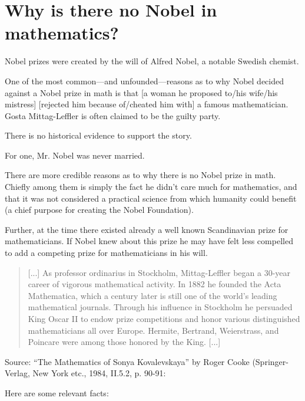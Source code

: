 \section{Why is there no Nobel in mathematics?}

Nobel prizes were created by the will of Alfred Nobel, a notable Swedish
chemist.

One of the most common---and unfounded---reasons as to why Nobel decided
against a Nobel prize in math is that [a woman he proposed to/his
wife/his mistress] [rejected him because of/cheated him with] a famous
mathematician. Gosta Mittag-Leffler is often claimed to be the guilty
party.

There is no historical evidence to support the story.

For one, Mr. Nobel was never married.

There are more credible reasons as to why there is no Nobel prize in
math. Chiefly among them is simply the fact he didn't care much for
mathematics, and that it was not considered a practical science from
which humanity could benefit (a chief purpose for creating the Nobel
Foundation).

Further, at the time there existed already a well known Scandinavian
prize for mathematicians. If Nobel knew about this prize he may have
felt less compelled to add a competing prize for mathematicians in his
will.

\begin{quote}
  [...] As professor ordinarius in Stockholm, Mittag-Leffler began a
  30-year career of vigorous mathematical activity. In 1882 he founded
  the Acta Mathematica, which a century later is still one of the
  world's leading mathematical journals. Through his influence in
  Stockholm he persuaded King Oscar II to endow prize competitions and
  honor various distinguished mathematicians all over Europe. Hermite,
  Bertrand, Weierstrass, and Poincare were among those honored by the
  King. [...]
\end{quote}
Source: ``The Mathematics of Sonya Kovalevskaya'' by Roger Cooke
(Springer-Verlag, New York etc., 1984, II.5.2, p. 90-91:


Here are some relevant facts:

